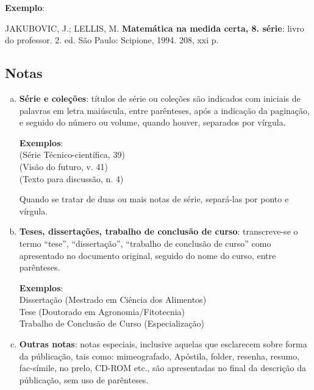 \begin{exemplomanual}
\textbf{Exemplo}:\\
\begin{singlespace}
JAKUBOVIC, J.; LELLIS, M. \textbf{Matemática na medida certa, 8. série}:
livro do professor. 2. ed. São Paulo: Scipione, 1994. 208, xxi p.
\end{singlespace}
\end{exemplomanual}


\subsection{Notas}

\begin{enumerate}[a)]
  \item  \textbf{Série e coleções}: títulos de série ou coleções são indicados com iniciais de palavras em letra maiúscula, entre parênteses, após a indicação da paginação, e seguido do número ou volume, quando houver, separados por vírgula.

\begin{exemplomanuallista}
\textbf{Exemplos}:\\
(Série Técnico-científica, 39)\\
(Visão do futuro, v. 41)\\
(Texto para discussão, n. 4)
\end{exemplomanuallista}

Quando se tratar de duas ou mais notas de série, separá-las por ponto e vírgula.

  \item  \textbf{Teses, dissertações, trabalho de conclusão de curso}: transcreve-se o termo ``tese'', ``dissertação'', ``trabalho de conclusão de curso'' como apresentado no documento original, seguido do nome do curso, entre parênteses.
   
\begin{exemplomanuallista}
\textbf{Exemplos}:\\
Dissertação (Mestrado em Ciência dos Alimentos)\\
Tese (Doutorado em Agronomia/Fitotecnia)\\
Trabalho de Conclusão de Curso (Especialização)
\end{exemplomanuallista}

  \item  \textbf{Outras notas}: notas especiais, inclusive aquelas que esclarecem sobre forma da públicação, tais como: mimeografado, Apóstila, folder, resenha, resumo, fac-símile, no prelo, CD-ROM etc., são apresentadas no final da descrição da públicação, sem uso de parênteses.
\end{enumerate}


